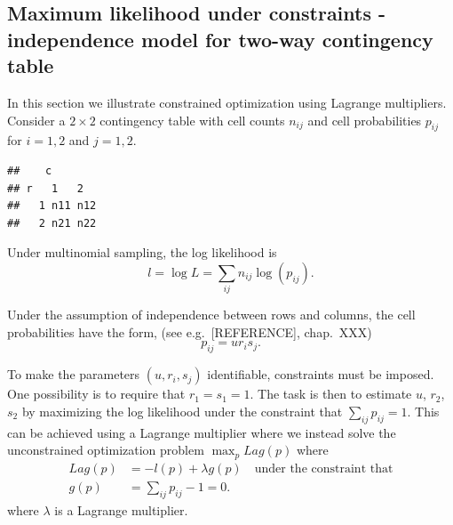 \documentclass[10pt,]{article}
\begin{document}
\hypertarget{sec:cont_tab}{%
\subsection{Maximum likelihood under constraints - independence model
for two-way contingency table}\label{sec:cont_tab}}

In this section we illustrate constrained optimization using Lagrange
multipliers. Consider a \(2 \times 2\) contingency table with cell
counts \(n_{ij}\) and cell probabilities \(p_{ij}\) for \(i=1,2\) and
\(j=1,2\).

\begin{verbatim}
##    c
## r   1   2  
##   1 n11 n12
##   2 n21 n22
\end{verbatim}

Under multinomial sampling, the log likelihood is \[
 l = \log L = \sum_{ij} n_{ij} \log(p_{ij}).
\]

Under the assumption of independence between rows and columns, the cell
probabilities have the form, (see e.g.~{[}REFERENCE{]}, chap.~XXX) \[
p_{ij}=u r_i s_j.
\]

To make the parameters \((u, r_i, s_j)\) identifiable, constraints must
be imposed. One possibility is to require that \(r_1=s_1=1\). The task
is then to estimate \(u\), \(r_2\), \(s_2\) by maximizing the log
likelihood under the constraint that \(\sum_{ij} p_{ij} = 1\). This can
be achieved using a Lagrange multiplier where we instead solve the
unconstrained optimization problem \(\max_p Lag(p)\) where \begin{align}
  Lag(p) &= -l(p) + \lambda g(p) \quad \text{under the constraint that} \\
  g(p) &= \sum_{ij} p_{ij} - 1 = 0.
\end{align} where \(\lambda\) is a Lagrange multiplier.
\end{document}
